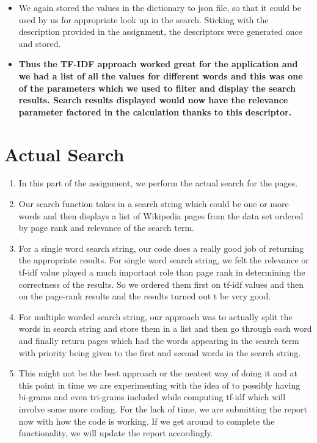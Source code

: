 \documentclass[11pt]{article}
\begin{document}
\begin{itemize}
	\item We again stored the values in the dictionary to json file, so that it could be used by us for appropriate look up in the search. Sticking with the description provided in the assignment, the descriptors were generated once and stored.
	
	\item{\textbf{Thus the TF-IDF approach worked great for the application and we had a list of all the values for different words and this was one of the parameters which we used to filter and display the search results. Search results displayed would now have the relevance parameter factored in the calculation thanks to this descriptor.}}
	
\end{itemize}

\section{Actual Search}


\begin{enumerate}

\item [] In this part of the assignment, we perform the actual search for the pages.

\item Our search function takes in a search string which could be one or more words and then displays a list of Wikipedia pages from the data set ordered by page rank and relevance of the search term.

\item For a single word search string, our code does a really good job of returning the appropriate results. For single word search string, we felt the relevance or tf-idf value played a much important role than page rank in determining the correctness of the results. So we ordered them first on tf-idf values and then on the page-rank results and the results turned out t be very good.

\item For multiple worded search string, our approach was to actually split the words in search string and store them in a list and then go through each word and finally return pages which had the words appearing in the search term with priority being given to the first and second words in the search string.

\item This might not be the best approach or the neatest way of doing it and at this point in time we are experimenting with the idea of to possibly having bi-grams and even tri-grams included while computing tf-idf which will involve some more coding. For the lack of time, we are submitting the report now with how the code is working. If we get around to complete the functionality, we will update the report accordingly.
     
\end{enumerate}
\end{document}
